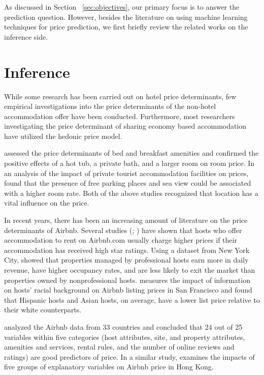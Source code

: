 
As discussed in Section ~\ref{sec:objectives}, our primary focus is to answer
the prediction question. However, besides the literature on using machine
learning techniques for price prediction, we first briefly review the related
works on the inference side.

\section{Inference}

While some research has been carried out on hotel price determinants, few
empirical investigations into the price determinants of the non-hotel
accommodation offer have been conducted.  Furthermore, most researchers
investigating the price determinant of sharing economy based accommodation have
utilized the hedonic price model.

\textcite{monty2003hedonic} assessed the price determinants of bed and breakfast
amenities and confirmed the positive effects of a hot tub, a private bath, and a
larger room on room price.  In an analysis of the impact of private tourist
accommodation facilities on prices, \textcite{portolan2013impact} found that the
presence of free parking places and sea view could be associated with a higher
room rate.  Both of the above studies recognized that location has a vital
influence on the price.

In recent years, there has been an increasing amount of literature on the price
determinants of Airbnb.  Several studies (\textcite{gutt2015sharing};
\textcite{ikkala2014defining} ) have shown that hosts who offer accommodation to
rent on Airbnb.com usually charge higher prices if their accommodation has
received high star ratings.  Using a dataset from New York City,
\textcite{li2016pros,} showed that properties managed by professional hosts earn
more in daily revenue, have higher occupancy rates, and are less likely to exit
the market than properties owned by nonprofessional hosts.
\textcite{kakar2016effects} measures the impact of information on hosts’ racial
background on Airbnb listing prices in San Francisco and found that Hispanic
hosts and Asian hosts, on average, have a lower list price relative to their
white counterparts.

\textcite{wang2017price} analyzed the Airbnb data from 33 countries and concluded
that 24 out of 25 variables within five categories (host attributes, site, and
property attributes, amenities and services, rental rules, and the number of
online reviews and ratings) are good predictors of price.  In a similar study,
\textcite{cai2019price} examines the impacts of five groups of
explanatory variables on Airbnb price in Hong Kong.


